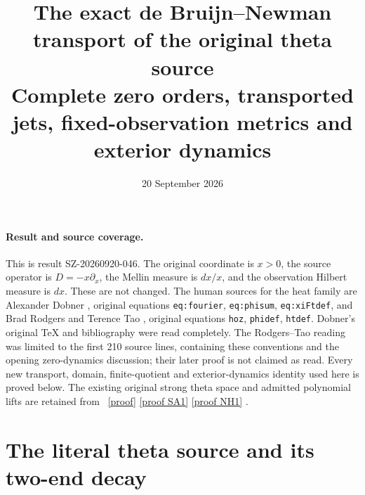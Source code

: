 \documentclass[11pt]{article}
\title{The exact de Bruijn--Newman transport of the original theta source\\
Complete zero orders, transported jets, fixed-observation metrics and exterior dynamics}
\author{}\date{20 September 2026}
\begin{document}
\maketitle

\paragraph{Result and source coverage.}
This is result SZ-20260920-046. The original coordinate is $x>0$,
the source operator is $D=-x\partial_x$, the Mellin measure is $dx/x$,
and the observation Hilbert measure is $dx$. These are not changed.
The human sources for the heat family are Alexander Dobner
\cite{Dobner}, original equations \texttt{eq:fourier},
\texttt{eq:phisum}, \texttt{eq:xiFtdef}, and Brad Rodgers and
Terence Tao \cite{RT}, original equations \texttt{hoz},
\texttt{phidef}, \texttt{htdef}. Dobner's original TeX and bibliography
were read completely. The Rodgers--Tao reading was limited to the
first 210 source lines, containing these conventions and the opening
zero-dynamics discussion; their later proof is not claimed as read.
Every new transport, domain, finite-quotient and exterior-dynamics
identity used here is proved below. The existing original strong
theta space and admitted polynomial lifts are retained from
\cite{Closed,Native}%
~\href{https://github.com/KokunoYumeto/zeta-function-research-reader/blob/5992ad50c0f2a06921f1fcaded7b4e38097c0739/workbenches/splitzero-tandem/continuations/20260920-original-kernel-mixed-determinants/providers/ORIGINAL_THETA_CLOSED_RANGE.tex\#L1}{[proof]} \href{https://github.com/KokunoYumeto/zeta-function-research-reader/blob/5992ad50c0f2a06921f1fcaded7b4e38097c0739/workbenches/splitzero-tandem/continuations/20260920-original-kernel-mixed-determinants/providers/NATIVE_SPECTRAL_ACTION.tex\#L31}{[proof SA1]} \href{https://github.com/KokunoYumeto/zeta-function-research-reader/blob/5992ad50c0f2a06921f1fcaded7b4e38097c0739/workbenches/splitzero-tandem/continuations/20260920-original-kernel-mixed-determinants/providers/NATIVE_HEAT_ACTION.tex\#L41}{[proof NH1]}%
{}.

\section{The literal theta source and its two-end decay}
\end{document}

